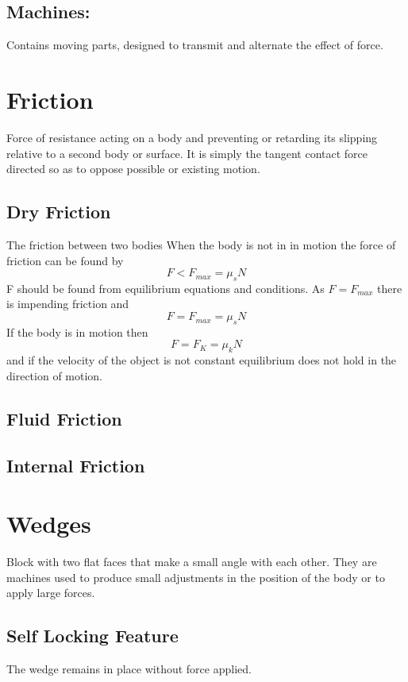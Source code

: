 \documentclass[14pt]{article}
\begin{document}
    \subsection{Machines:}
    Contains moving parts, designed to transmit and alternate the effect of force.
    \section{Friction}
    Force of resistance acting on a body and preventing or retarding its slipping relative to a second body or surface. It is simply the tangent contact force directed so as to oppose possible or existing motion.
    \subsection{Dry Friction}
    The friction between two bodies
    When the body is not in in motion the force of friction can be found by
    $$F<F_{max}=\mu_sN$$
    F should be found from equilibrium equations and conditions. 
    As $F=F_{max}$ there is impending friction and $$F=F_{max}=\mu_sN$$
    If the body is in motion then 
    $$F=F_K=\mu_kN$$
    and if the velocity of the object is not constant equilibrium does not hold in the direction of motion.
    \subsection{Fluid Friction}
    \subsection{Internal Friction}
    \section{Wedges}
    Block with two flat faces that make a small angle with each other. They are machines used to produce small adjustments in the position of the body or to apply large forces. 
    \subsection{Self Locking Feature}
    The wedge remains in place without force applied. 
\end{document}

